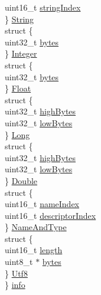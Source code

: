 \begin{DoxyCompactItemize}
\begin{tabbing}
\>\>uint16\_t \hyperlink{structCpInfo_af3623a7e7a8ddca66051e5c8284f6787}{stringIndex}\\
\>\} \hyperlink{structCpInfo_ac48615bcfbb835d4edd3242ed6e2a172}{String}\\
\>struct \{\\
\>\>uint32\_t \hyperlink{structCpInfo_aff3858879ad5feb452a5fc0504e99c1b}{bytes}\\
\>\} \hyperlink{structCpInfo_a9b5d6434dd5cf3962040f5a6d88e7525}{Integer}\\
\>struct \{\\
\>\>uint32\_t \hyperlink{structCpInfo_aff3858879ad5feb452a5fc0504e99c1b}{bytes}\\
\>\} \hyperlink{structCpInfo_aa3ff2e1b209ebdd271bb63c7b0e9e831}{Float}\\
\>struct \{\\
\>\>uint32\_t \hyperlink{structCpInfo_abf76d0c47da17a577a8a48f79094cce7}{highBytes}\\
\>\>uint32\_t \hyperlink{structCpInfo_adc1acf10dac8926ec1f95dec233ce7ef}{lowBytes}\\
\>\} \hyperlink{structCpInfo_a910c4b5bfb7d3f2d136a34bdbdcd7a00}{Long}\\
\>struct \{\\
\>\>uint32\_t \hyperlink{structCpInfo_abf76d0c47da17a577a8a48f79094cce7}{highBytes}\\
\>\>uint32\_t \hyperlink{structCpInfo_adc1acf10dac8926ec1f95dec233ce7ef}{lowBytes}\\
\>\} \hyperlink{structCpInfo_a0e6265ea65e306efc9f4f5ea76b5c91c}{Double}\\
\>struct \{\\
\>\>uint16\_t \hyperlink{structCpInfo_a33528d25dc35e61040a6ad480d6f9959}{nameIndex}\\
\>\>uint16\_t \hyperlink{structCpInfo_a191f64df1904c962d9f699f2e9fec7b0}{descriptorIndex}\\
\>\} \hyperlink{structCpInfo_a5a6ef04a5febd72e0202d0cf53de19d6}{NameAndType}\\
\>struct \{\\
\>\>uint16\_t \hyperlink{structCpInfo_a8876751cacc7818d9748366a35ef85f7}{length}\\
\>\>uint8\_t $\ast$ \hyperlink{structCpInfo_acdf9242daedb1b37c82f24e6665edb10}{bytes}\\
\>\} \hyperlink{structCpInfo_a269d1c1505fdf90973102d733552db05}{Utf8}\\
\} \hyperlink{structCpInfo_a67bf62f1bfb88277813bff0a1524a854}{info}\\

\end{tabbing}\end{DoxyCompactItemize}


